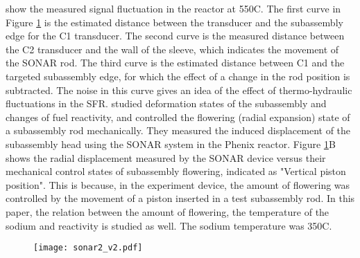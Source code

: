 \cite{Berton1996Continuousmonitoringof} show the measured signal fluctuation in the reactor at \num{550}\textdegree{}C.
The first curve in Figure \ref{fig:sonar2} is the estimated distance between the transducer and the subassembly edge for the C1 transducer.
The second curve is the measured distance between the C2 transducer and the wall of the sleeve, which indicates the movement of the SONAR rod.
The third curve is the estimated distance between C1 and the targeted subassembly edge, for which the effect of a change in the rod position is subtracted.
The noise in this curve gives an idea of the effect of thermo-hydraulic fluctuations in the SFR.
\cite{Fontaine2011Descriptionandpreliminary} studied deformation states of the subassembly and changes of fuel reactivity, and controlled the flowering (radial expansion) state
of a subassembly rod mechanically.
They measured the induced displacement of the subassembly head using the SONAR system in the Phenix reactor.
Figure \ref{fig:sonar2}B shows the radial displacement measured by the SONAR device versus their mechanical control states of subassembly flowering,
indicated as "Vertical piston position".
This is because, in the experiment device, the amount of flowering was controlled by the movement of a piston inserted in a test subassembly rod.
In this paper, the relation between the amount of flowering, the temperature of the sodium and reactivity is studied as well.
The sodium temperature was \num{350}\textdegree{}C.

\begin{figure}[htbp]
    \centerline{\texttt{[image: sonar2\_v2.pdf]}}
    \label{fig:sonar2}
\end{figure}

